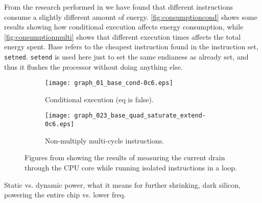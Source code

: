 From the research performed in \cite{rundehvatum2013exploring} we have found
that different instructions consume a slightly different amount of energy.
\autoref{fig:consumptioncond} shows some results showing how conditional
execution affects energy consumption, while \autoref{fig:consumptionmulti}
shows that different execution times affects the total energy spent. Base
refers to the cheapest instruction found in the instruction set, \texttt{setned}.
\texttt{setend} is used here just to set the same endianess as already set,
and thus it flushes the processor without doing anything else.


\begin{figure}
\begin{subfigure}[b]{0.48\textwidth}
\texttt{[image: graph\_01\_base\_cond-0c6.eps]}
\caption{Conditional execution (eq is false).}
\label{fig:consumptioncond}
\end{subfigure}
\begin{subfigure}[b]{0.52\textwidth}
\texttt{[image: graph\_023\_base\_quad\_saturate\_extend-0c6.eps]}
\caption{Non-multiply multi-cycle instructions.}
\label{fig:consumptionmulti}
\end{subfigure}
\caption{Figures from \cite{rundehvatum2013exploring} showing the results of measuring the
current drain through the CPU core while running isolated instructions in a loop.}
\label{fig:consumption}
\end{figure}



Static vs. dynamic power, what it means for further shrinking, dark silicon, powering
the entire chip vs. lower freq.


